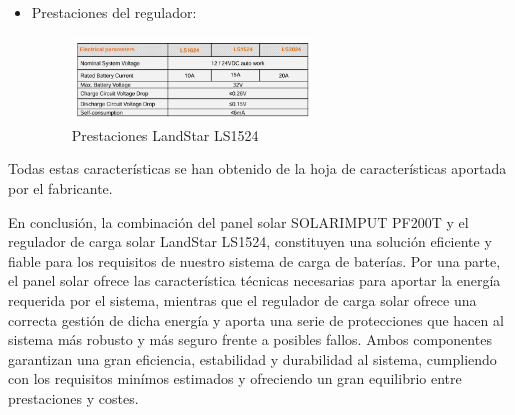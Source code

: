 \begin{itemize}
    \item Prestaciones del regulador:
    \begin{figure}[H]
        \centering
        \includegraphics[width=0.6\textwidth]{images/2-hardware/Panel Solar/Regulador.png}
        \caption{Prestaciones LandStar LS1524}
        \label{fig:4-1-2-Regulador}
    \end{figure}
\end{itemize}

Todas estas características se han obtenido de la hoja de características aportada por el fabricante.

En conclusión, la combinación del panel solar SOLARIMPUT PF200T y el regulador de carga solar LandStar LS1524, constituyen una solución eficiente y fiable para los requisitos de nuestro sistema de carga de baterías. Por una parte, el panel solar ofrece las característica técnicas necesarias para aportar la energía requerida por el sistema, mientras que el regulador de carga solar ofrece una correcta gestión de dicha energía y aporta una serie de protecciones que hacen al sistema más robusto y más seguro frente a posibles fallos. Ambos componentes garantizan una gran eficiencia, estabilidad y durabilidad al sistema, cumpliendo con los requisitos minímos estimados y ofreciendo un gran equilibrio entre prestaciones y costes.